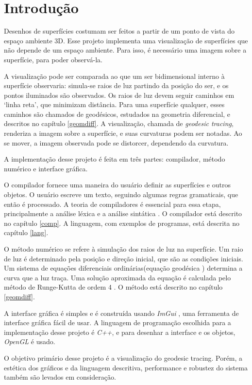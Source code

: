 \chapter{Introdução}
Desenhos de superfícies costumam ser feitos a partir de um ponto de vista do
espaço ambiente 3D.
Esse projeto implementa uma visualização de superfícies que não depende de um espaço ambiente.
Para isso, é necessário uma imagem sobre a superfície, para poder observá-la.

A visualização pode ser comparada ao que um ser bidimensional interno à superfície observaria:
simula-se raios de luz partindo da posição do ser, e os pontos iluminados são observados.
Os raios de luz devem seguir caminhos em `linha reta', que minimizam distância.
Para uma superfície qualquer, esses caminhos são chamados de geodésicos,
estudados na geometria diferencial, e descritos no capítulo \ref{geomdiff}.
A visualização, chamada de \textit{geodesic tracing}, renderiza a imagem sobre a superfície,
e suas curvaturas podem ser notadas. Ao se mover, a imagem observada pode se distorcer,
dependendo da curvatura.

A implementação desse projeto é feita em três partes:
compilador, método numérico e interface gráfica.

O compilador fornece uma maneira do usuário definir as superfícies e outros objetos.
O usuário escreve um texto, seguindo algumas regras gramaticais, que então é processado.
A teoria de compiladores é essencial para essa etapa,
principalmente a análise léxica e a análise sintática \cite{Dragon:1}.
O compilador está descrito no capítulo \ref{comp}.
A linguagem, com exemplos de programas, está descrita no capítulo \ref{lang}.

O método numérico se refere à simulação dos raios de luz na superfície.
Um raio de luz é determinado pela posição e direção inicial, que são as condições iniciais.
Um sistema de equações diferenciais ordinárias(equação geodésica \cite{GeomDiff:1})
determina a curva que a luz traça.
Uma solução aproximada da equação é calculada pelo método de Runge-Kutta de ordem 4 \cite{Anal:1}.
O método está descrito no capítulo \ref{geomdiff}.

A interface gráfica é simples e é construída usando \textit{ImGui} \cite{ImGui},
uma ferramenta de interface gráfica fácil de usar.
A linguagem de programação escolhida para a implementação desse projeto é \textit{C++},
e para desenhar a interface e os objetos, \textit{OpenGL} é usado.

O objetivo primário desse projeto é a visualização do geodesic tracing.
Porém, a estética dos gráficos e da linguagem descritiva, performance 
e robustez do sistema também são levados em consideração.
